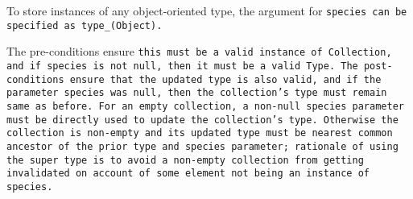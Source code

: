 To store instances of any object-oriented type,
the argument for \tt{species} can be specified as \tt{type_(Object)}.


\noindent{}

\enlargethispage*{\baselineskip}
\enlargethispage*{\baselineskip}

The pre-conditions ensure \tt{this} must be a valid instance of \tt{Collection},
and if \tt{species} is not null, then it must be a valid \tt{Type}.
The post-conditions ensure that the updated type is also valid,
and if the parameter \tt{species} was null,
then the collection's type must remain same as before.
For an empty collection, a non-null \tt{species} parameter
must be directly used to update the collection's type.
Otherwise the collection is non-empty and its updated type must be
nearest common ancestor of the prior type and \tt{species} parameter;
rationale of using the super type is to avoid a non-empty collection from getting
invalidated on account of some element not being an instance of \tt{species}.


\noindent{}
